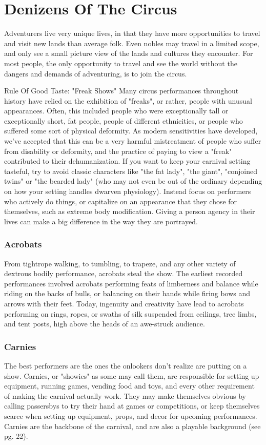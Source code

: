 \documentclass[10pt,a4paper,twoside,twocolumn,openany,bg=print,nodeprecatedcode]{dndbook}
\begin{document}
\chapter{Denizens Of The Circus}
Adventurers live very unique lives, in that they have more opportunities to travel and visit new lands than average folk. Even nobles may travel in a limited scope, and only see a small picture view of the lands and cultures they encounter. For most people, the only opportunity to travel and see the world without the dangers and demands of adventuring, is to join the circus.
\begin{DndComment}{Rule Of Good Taste: "Freak Shows"}
Many circus performances throughout history have relied on the exhibition of "freaks", or rather, people with unusual appearances. Often, this included people who were exceptionally tall or exceptionally short, fat people, people of different ethnicities, or people who suffered some sort of physical deformity. As modern sensitivities have developed, we've accepted that this can be a very harmful mistreatment of people who suffer from disability or deformity, and the practice of paying to view a "freak" contributed to their dehumanization.
If you want to keep your carnival setting tasteful, try to avoid classic characters like "the fat lady", "the giant", "conjoined twins" or "the bearded lady" (who may not even be out of the ordinary depending on how your setting handles dwarven physiology). Instead focus on performers who actively do things, or capitalize on an appearance that they chose for themselves, such as extreme body modification. Giving a person agency in their lives can make a big difference in the way they are portrayed.
\end{DndComment}

\subsection{Acrobats}
From tightrope walking, to tumbling, to trapeze, and any other variety of dextrous bodily performance, acrobats steal the show. The earliest recorded performances involved acrobats performing feats of limberness and balance while riding on the backs of bulls, or balancing on their hands while firing bows and arrows with their feet. Today, ingenuity and creativity have lead to acrobats performing on rings, ropes, or swaths of silk suspended from ceilings, tree limbs, and tent posts, high above the heads of an awe-struck audience.
\subsection{Carnies}
The best performers are the ones the onlookers don't realize are putting on a show. Carnies, or "showies" as some may call them, are responsible for setting up equipment, running games, vending food and toys, and every other requirement of making the carnival actually work. They may make themselves obvious by calling passersbys to try their hand at games or competitions, or keep themselves scarce when setting up equipment, props, and decor for upcoming performances. Carnies are the backbone of the carnival, and are also a playable background (see pg. 22).
\end{document}
